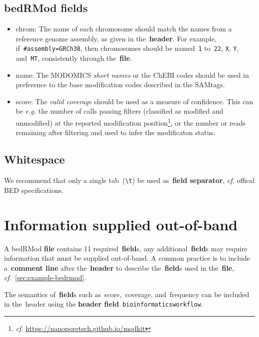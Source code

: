 \documentclass[11pt]{article}
\begin{document}
\subsection{\acs{bedRMod} fields}\label{sec:fields}
\begin{itemize}
\item \textsf{chrom}: The name of each chromosome should match the names from a reference genome assembly, as given in the~\textbf{header}. For example, if~\texttt{\#assembly=GRCh38}, then chromosomes should be named~\texttt{1} to~\texttt{22}, \texttt{X}, \texttt{Y}, and~\texttt{MT}, consistently through the~\textbf{file}.

\item \textsf{name}: The MODOMICS \emph{short names} or the ChEBI codes should be used in preference to the base modification codes described in the SAMtags.

\item \textsf{score}: The \emph{valid coverage} should be used as a measure of confidence. This can be \textit{e.g.} the number of calls passing filters (classified as modified and unmodified) at the reported modification position\footnote{\textit{cf.} \url{https://nanoporetech.github.io/modkit}}, or the number or reads remaining after filtering and used to infer the modificaton status.
\end{itemize}

\subsection{Whitespace}\label{sec:whitespace}
We recommend that only a single tab~(\texttt{{\textbackslash}t}) be used as~\textbf{field separator}, \textit{cf.} offical \ac{BED} specifications.

\section{Information supplied out-of-band}

A \ac{bedRMod} \textbf{file} contains 11 required~\textbf{field}s, any additional~\textbf{field}s may require information that must be supplied out-of-band. A common practice is to include a~\textbf{comment line} after the~\textbf{header} to describe the~\textbf{field}s used in the~\textbf{file}, \textit{cf.}~\autoref{sec:example-bedrmod}.

The semantics of~\textbf{field}s such as~\textsf{score},~\textsf{coverage}, and~\textsf{frequency} can be included in the~\textsf{header} using the \textbf{header field}~\texttt{bioinformatics\textunderscore workflow}.
\end{document}
